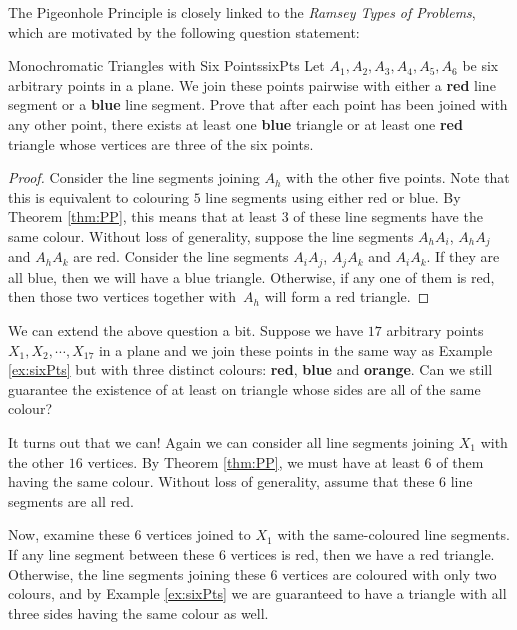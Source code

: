 \documentclass[math]{amznotes}
\theoremstyle{remark}
\begin{document}
The Pigeonhole Principle is closely linked to the \textit{Ramsey Types of Problems}, which are motivated by the following question statement:
\begin{exbox}{Monochromatic Triangles with Six Points}{sixPts}
    Let $A_1, A_2, A_3, A_4, A_5, A_6$ be six arbitrary points in a plane. We join these points pairwise with either a {\color{red} \textbf{red}} line segment or a {\color{blue} \textbf{blue}} line segment. Prove that after each point has been joined with any other point, there exists at least one {\color{blue} \textbf{blue}} triangle or at least one {\color{red} \textbf{red}} triangle whose vertices are three of the six points.
    \tcblower   
    \begin{proof}
        Consider the line segments joining $A_h$ with the other five points. Note that this is equivalent to colouring $5$ line segments using either red or blue. By Theorem \ref{thm:PP}, this means that at least $3$ of these line segments have the same colour. Without loss of generality, suppose the line segments $A_hA_i$, $A_hA_j$ and $A_hA_k$ are red. Consider the line segments $A_iA_j$, $A_jA_k$ and $A_iA_k$. If they are all blue, then we will have a blue triangle. Otherwise, if any one of them is red, then those two vertices together with~$A_h$ will form a red triangle.
    \end{proof}
\end{exbox}
We can extend the above question a bit. Suppose we have $17$ arbitrary points $X_1, X_2, \cdots, X_{17}$ in a plane and we join these points in the same way as Example \ref{ex:sixPts} but with three distinct colours: {\color{red} \textbf{red}}, {\color{blue} \textbf{blue}} and {\color{orange} \textbf{orange}}. Can we still guarantee the existence of at least on triangle whose sides are all of the same colour?

It turns out that we can! Again we can consider all line segments joining $X_1$ with the other $16$ vertices. By Theorem \ref{thm:PP}, we must have at least $6$ of them having the same colour. Without loss of generality, assume that these $6$ line segments are all red.

Now, examine these $6$ vertices joined to $X_1$ with the same-coloured line segments. If any line segment between these $6$ vertices is red, then we have a red triangle. Otherwise, the line segments joining these $6$ vertices are coloured with only two colours, and by Example \ref{ex:sixPts} we are guaranteed to have a triangle with all three sides having the same colour as well.
\end{document}
